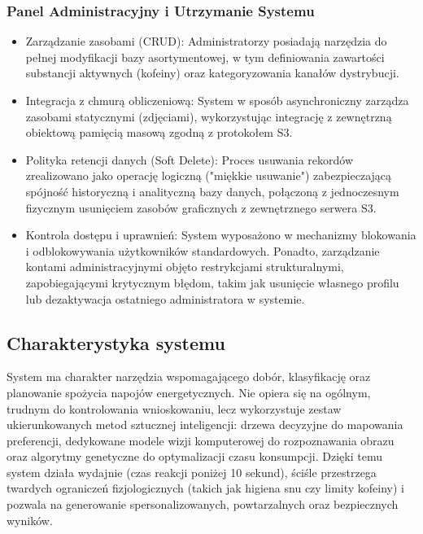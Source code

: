 \documentclass[12pt,a4paper]{article}
\begin{document}
\subsubsection{Panel Administracyjny i Utrzymanie Systemu}
\begin{itemize}
    \item Zarządzanie zasobami (CRUD): Administratorzy posiadają narzędzia do pełnej modyfikacji bazy asortymentowej, w tym definiowania zawartości substancji aktywnych (kofeiny) oraz kategoryzowania kanałów dystrybucji.
    \item Integracja z chmurą obliczeniową: System w sposób asynchroniczny zarządza zasobami statycznymi (zdjęciami), wykorzystując integrację z zewnętrzną obiektową pamięcią masową zgodną z protokołem S3.
    \item Polityka retencji danych (Soft Delete): Proces usuwania rekordów zrealizowano jako operację logiczną ("miękkie usuwanie") zabezpieczającą spójność historyczną i analityczną bazy danych, połączoną z jednoczesnym fizycznym usunięciem zasobów graficznych z zewnętrznego serwera S3.
    \item Kontrola dostępu i uprawnień: System wyposażono w mechanizmy blokowania i odblokowywania użytkowników standardowych. Ponadto, zarządzanie kontami administracyjnymi objęto restrykcjami strukturalnymi, zapobiegającymi krytycznym błędom, takim jak usunięcie własnego profilu lub dezaktywacja ostatniego administratora w systemie.
\end{itemize}

\newpage

\subsection{Charakterystyka systemu}
System ma charakter narzędzia wspomagającego dobór, klasyfikację oraz planowanie spożycia napojów energetycznych. Nie opiera się na ogólnym, trudnym do kontrolowania wnioskowaniu, lecz wykorzystuje zestaw ukierunkowanych metod sztucznej inteligencji: drzewa decyzyjne do mapowania preferencji, dedykowane modele wizji komputerowej do rozpoznawania obrazu oraz algorytmy genetyczne do optymalizacji czasu konsumpcji. Dzięki temu system działa wydajnie (czas reakcji poniżej 10 sekund), ściśle przestrzega twardych ograniczeń fizjologicznych (takich jak higiena snu czy limity kofeiny) i pozwala na generowanie spersonalizowanych, powtarzalnych oraz bezpiecznych wyników.
\end{document}
